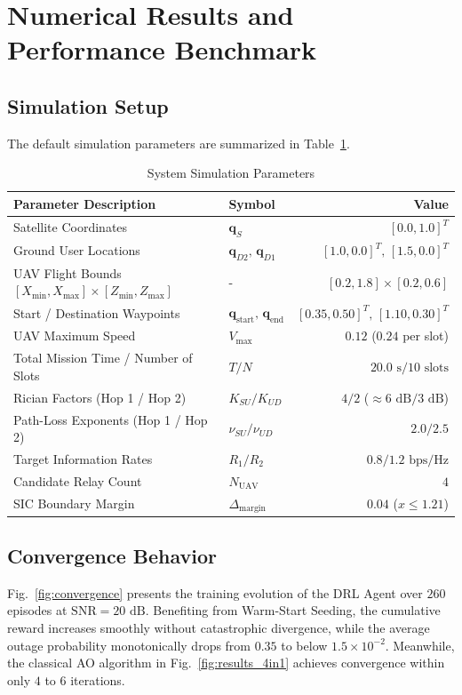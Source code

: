 \section{Numerical Results and Performance Benchmark}
\label{sec:results}

\subsection{Simulation Setup}
The default simulation parameters are summarized in Table~\ref{tab:params}.

\begin{table}[h]
\centering
\caption{System Simulation Parameters}
\label{tab:params}
\begin{tabular}{llr}
\toprule
\textbf{Parameter Description} & \textbf{Symbol} & \textbf{Value} \\
\midrule
Satellite Coordinates & $\mathbf{q}_S$ & $[0.0, 1.0]^T$ \\
Ground User Locations & $\mathbf{q}_{D2}, \, \mathbf{q}_{D1}$ & $[1.0, 0.0]^T, \, [1.5, 0.0]^T$ \\
UAV Flight Bounds $[X_{\min}, X_{\max}] \times [Z_{\min}, Z_{\max}]$ & - & $[0.2, 1.8] \times [0.2, 0.6]$ \\
Start / Destination Waypoints & $\mathbf{q}_{\text{start}}, \, \mathbf{q}_{\text{end}}$ & $[0.35, 0.50]^T, \, [1.10, 0.30]^T$ \\
UAV Maximum Speed & $V_{\max}$ & $0.12$ ($0.24$ per slot) \\
Total Mission Time / Number of Slots & $T / N$ & $20.0\text{ s} / 10\text{ slots}$ \\
Rician Factors (Hop 1 / Hop 2) & $K_{SU} / K_{UD}$ & $4 / 2$ ($\approx 6\text{ dB} / 3\text{ dB}$) \\
Path-Loss Exponents (Hop 1 / Hop 2) & $\nu_{SU} / \nu_{UD}$ & $2.0 / 2.5$ \\
Target Information Rates & $R_1 / R_2$ & $0.8 / 1.2\text{ bps/Hz}$ \\
Candidate Relay Count & $N_{\text{UAV}}$ & $4$ \\
SIC Boundary Margin & $\Delta_{\text{margin}}$ & $0.04$ ($x \le 1.21$) \\
\bottomrule
\end{tabular}
\end{table}

\subsection{Convergence Behavior}
Fig.~\ref{fig:convergence} presents the training evolution of the DRL Agent over $260$ episodes at $\text{SNR} = 20\text{ dB}$. Benefiting from Warm-Start Seeding, the cumulative reward increases smoothly without catastrophic divergence, while the average outage probability monotonically drops from $0.35$ to below $1.5 \times 10^{-2}$. Meanwhile, the classical AO algorithm in Fig.~\ref{fig:results_4in1} achieves convergence within only $4$ to $6$ iterations.

